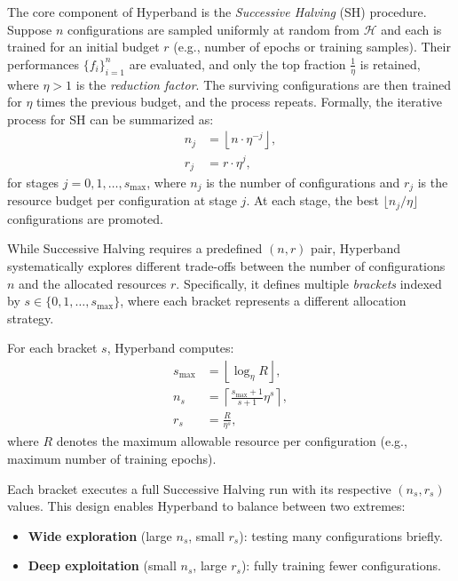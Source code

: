 The core component of Hyperband is the \textit{Successive Halving} (SH) procedure. Suppose $n$ configurations are sampled uniformly at random from $\mathcal{H}$ and each is trained for an initial budget $r$ (e.g., number of epochs or training samples). Their performances $\{f_i\}_{i=1}^{n}$ are evaluated, and only the top fraction $\frac{1}{\eta}$ is retained, where $\eta > 1$ is the \textit{reduction factor}. The surviving configurations are then trained for $\eta$ times the previous budget, and the process repeats. Formally, the iterative process for SH can be summarized as:
\begin{align}
    n_j &= \left\lfloor n \cdot \eta^{-j} \right\rfloor, \\
    r_j &= r \cdot \eta^{j},
    \label{eq:successive_halving}
\end{align}
for stages $j = 0, 1, \ldots, s_{\max}$, where $n_j$ is the number of configurations and $r_j$ is the resource budget per configuration at stage $j$. At each stage, the best $\lfloor n_j / \eta \rfloor$ configurations are promoted.

While Successive Halving requires a predefined $(n, r)$ pair, Hyperband systematically explores different trade-offs between the number of configurations $n$ and the allocated resources $r$. Specifically, it defines multiple \textit{brackets} indexed by $s \in \{0, 1, \ldots, s_{\max}\}$, where each bracket represents a different allocation strategy.

For each bracket $s$, Hyperband computes:
\begin{align}
    s_{\max} &= \left\lfloor \log_{\eta} R \right\rfloor, \\
    n_s &= \left\lceil \frac{s_{\max} + 1}{s + 1} \eta^s \right\rceil, \\
    r_s &= \frac{R}{\eta^s},
    \label{eq:hyperband_parameters}
\end{align}
where $R$ denotes the maximum allowable resource per configuration (e.g., maximum number of training epochs).

Each bracket executes a full Successive Halving run with its respective $(n_s, r_s)$ values. This design enables Hyperband to balance between two extremes:
\begin{itemize}
    \item \textbf{Wide exploration} (large $n_s$, small $r_s$): testing many configurations briefly.
    \item \textbf{Deep exploitation} (small $n_s$, large $r_s$): fully training fewer configurations.
\end{itemize}


